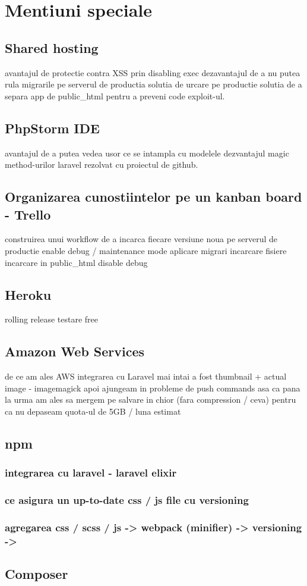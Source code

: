 \section{Mentiuni speciale}
	\subsection{Shared hosting}
		avantajul de protectie contra XSS prin disabling exec
		dezavantajul de a nu putea rula migrarile pe serverul de productia
		solutia de urcare pe productie
		solutia de a separa app de public\_html pentru a preveni code exploit-ul.
	\subsection{PhpStorm IDE}
		avantajul de a putea vedea usor ce se intampla cu modelele
		dezvantajul magic method-urilor laravel rezolvat cu proiectul de github.
	\subsection{Organizarea cunostiintelor pe un kanban board - Trello}
		construirea unui workflow de a incarca fiecare versiune noua pe serverul de productie
			enable debug / maintenance mode
			aplicare migrari
			incarcare fisiere
			incarcare in public\_html
			disable debug
	\subsection{Heroku}
		rolling release
		testare
		free
	\subsection{Amazon Web Services}
		de ce am ales AWS
		integrarea cu Laravel
		mai intai a fost thumbnail + actual image - imagemagick
		apoi ajungeam in probleme de push commands
		asa ca pana la urma am ales sa mergem pe salvare in chior (fara compression / ceva)
			pentru ca nu depaseam quota-ul de 5GB / luna estimat
	\subsection{npm}
		\subsubsection{integrarea cu laravel - laravel elixir}
		\subsubsection{ce asigura un up-to-date css / js file cu versioning}
		\subsubsection{agregarea css / scss / js -> webpack (minifier) -> versioning ->}
	\subsection{Composer}
